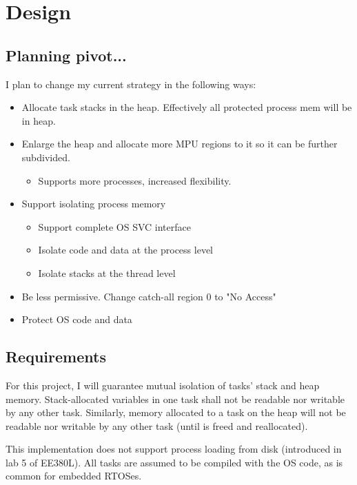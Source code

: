 
\chapter{Design}

\section{Planning pivot...}

I plan to change my current strategy in the following ways:

\begin{itemize}
    
 \item Allocate task stacks in the heap. Effectively all protected process mem will be in heap.
 \item Enlarge the heap and allocate more MPU regions to it so it can be further subdivided.
    \begin{itemize}
        \item Supports more processes, increased flexibility.
    \end{itemize}
 \item Support isolating process memory
    \begin{itemize}
        \item Support complete OS SVC interface
        \item Isolate code and data at the process level
        \item Isolate stacks at the thread level
    \end{itemize}
 \item Be less permissive. Change catch-all region 0 to "No Access"
 \item Protect OS code and data

\end{itemize}


\section{Requirements}

For this project, I will guarantee mutual isolation of tasks' stack and heap memory. Stack-allocated variables in one task shall not be readable nor writable by any other task. Similarly, memory allocated to a task on the heap will not be readable nor writable by any other task (until is freed and reallocated).

This implementation does not support process loading from disk (introduced in lab 5 of EE380L). All tasks are assumed to be compiled with the OS code, as is common for embedded RTOSes.

